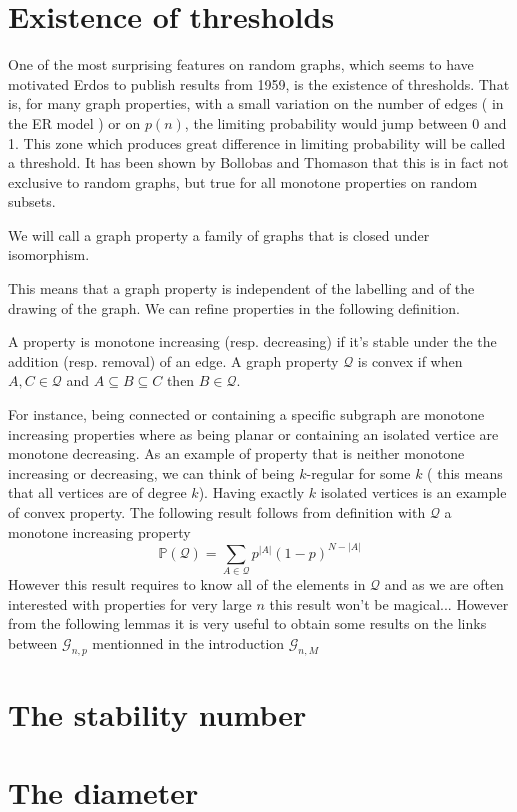 \section{Existence of thresholds}
One of the most surprising features on random graphs, which seems to have motivated Erdos to publish results from 1959, is the existence of thresholds. That is, for many graph properties, with a small variation on the number of edges ( in the ER model ) or on $p(n)$, the limiting probability would jump between 0 and 1.
This zone which produces great difference in limiting probability will be called a threshold.
It has been shown by Bollobas and Thomason that this is in fact not exclusive to random graphs, but true for all monotone properties on random subsets.
\begin{definition}
We will call a graph property a family of graphs that is closed under isomorphism.
\end{definition}
This means that a graph property is independent of the labelling and of the drawing of the graph.
We can refine properties in the following definition.
\begin{definition}
	A property is monotone increasing (resp. decreasing) if it's stable under the the addition (resp. removal) of an edge.
	A graph property $\mathcal{Q}$ is convex if when $ A,C \in \mathcal{Q}$ and $A\subseteq B\subseteq C$ then $B \in \mathcal{Q}$. 
\end{definition}
For instance, being connected or containing a specific subgraph are monotone increasing properties where as being planar or containing an isolated vertice are monotone decreasing. As an example of property that is neither monotone increasing or decreasing, we can think of being $k$-regular for some $k$ ( this means that all vertices are of degree $k$). Having exactly $k$ isolated vertices is an example of convex property.
\newline
The following result follows from definition with $\mathcal{Q}$ a monotone increasing property
\begin{equation}
	\mathbb{P}(\mathcal{Q}) = \sum_{A \in \mathcal{Q}} p^{|A|}(1-p)^{N-|A|}
\end{equation}
However this result requires to know all of the elements in $\mathcal{Q}$ and as we are often interested with properties for very large $n$ this result won't be magical... However from the following lemmas it is very useful to obtain some results on the links between $\mathcal{G}_{n, p}$ mentionned in the introduction $\mathcal{G}_{n, M}$



\section{The stability number}
\section{The diameter}
